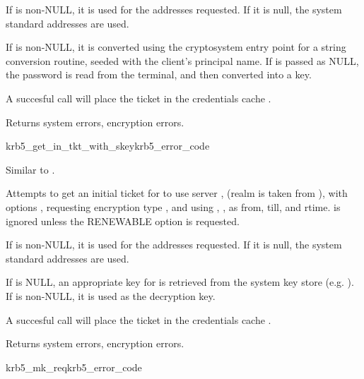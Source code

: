 If  is non-NULL, it is used for the addresses
requested.  If it is null, the system standard addresses are used.

If  is non-NULL, it is converted using the
cryptosystem entry point for a string conversion routine, seeded with
the client's principal name.  If  is passed as NULL,
the password is read from the terminal, and then converted into a key.

A succesful call will place the ticket in the credentials cache
.

Returns system errors, encryption errors.

\begin{funcdecl}{krb5_get_in_tkt_with_skey}{krb5_error_code}{\funcin}
\funcinout
{}
\end{funcdecl}
Similar to .

Attempts to get an initial ticket for  to use server
, (realm is taken from
), with options , requesting
encryption type , and using 
, ,
 as from, till, and rtime.
 is ignored unless the
RENEWABLE option is requested.

If  is non-NULL, it is used for the addresses
requested.  If it is null, the system standard addresses are used.

If  is NULL, an appropriate key for
 is retrieved from the system key store (e.g.
).  If  is non-NULL, it is
used as the decryption key.

A succesful call will place the ticket in the credentials cache
.

Returns system errors, encryption errors.

\begin{funcdecl}{krb5_mk_req}{krb5_error_code}{\funcin}
\funcout
{}
\end{funcdecl}


